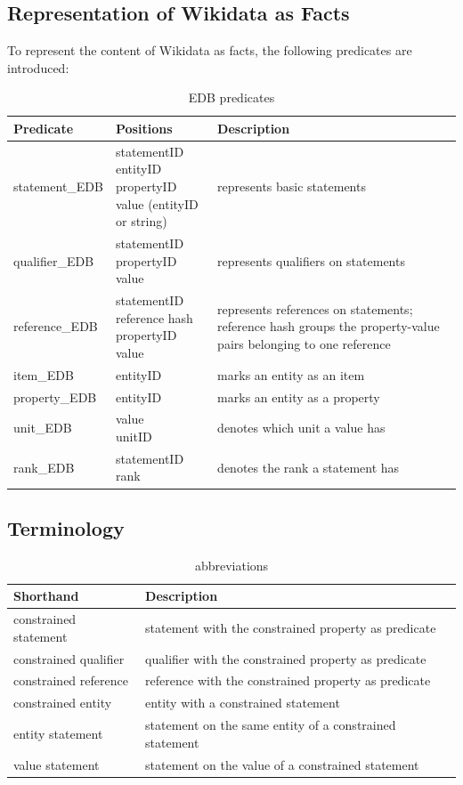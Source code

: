 \documentclass[hyperref,bachelorofscience,fleqn]{cgvpub}
\begin{document}
\subsection{Representation of Wikidata as Facts}\label{subsec_representation}
To represent the content of Wikidata as facts, the following predicates are introduced:
\begin{table}[H]
\caption{EDB predicates}\label{tab_predicates}
\begin{tabular}{llp{8.5cm}}
Predicate & Positions & Description \\
\hline
statement\_EDB & \makecell{statementID \\ entityID \\ propertyID \\ value (entityID or string)} & represents basic statements \\
\hline
qualifier\_EDB & \makecell{statementID \\ propertyID \\ value} & represents qualifiers on statements \\
\hline
reference\_EDB & \makecell{statementID \\ reference hash \\ propertyID \\ value} & represents references on statements; reference hash groups the property-value pairs belonging to one reference \\
\hline
item\_EDB & entityID & marks an entity as an item \\
property\_EDB & entityID & marks an entity as a property \\
\hline
unit\_EDB & \makecell{value \\ unitID} & denotes which unit a value has \\
\hline
rank\_EDB & \makecell{statementID \\ rank} & denotes the rank a statement has
\end{tabular}
\end{table}

\subsection{Terminology}
\begin{table}[H]
\caption{abbreviations}\label{tab_abbreviations}
\begin{tabular}{ll}
Shorthand & Description \\
\hline
constrained statement & statement with the constrained property as predicate \\
constrained qualifier & qualifier with the constrained property as predicate \\
constrained reference & reference with the constrained property as predicate \\
constrained entity & entity with a constrained statement \\
entity statement & statement on the same entity of a constrained statement \\
value statement & statement on the value of a constrained statement
\end{tabular}
\end{table}
\end{document}
